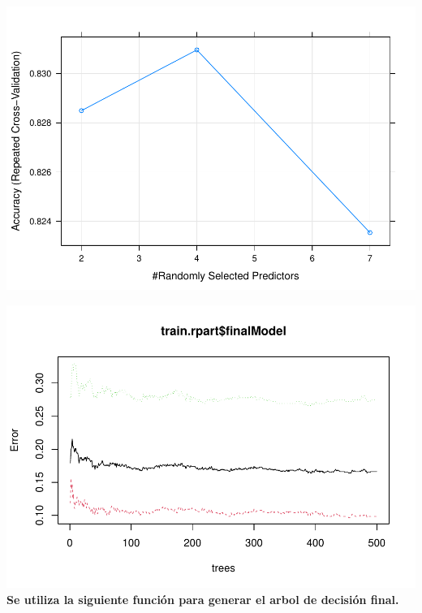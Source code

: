 \documentclass[
]{article}
\newenvironment{Shaded}{\begin{snugshade}}{\end{snugshade}}
\newcommand{\KeywordTok}[1]{\textcolor[rgb]{0.94,0.87,0.69}{#1}}
\newcommand{\NormalTok}[1]{\textcolor[rgb]{0.80,0.80,0.80}{#1}}
\newcommand{\OperatorTok}[1]{\textcolor[rgb]{0.94,0.94,0.82}{#1}}
\begin{document}
\includegraphics{m2851_PRA2_aruizplaza_rcotillas_files/figure-latex/unnamed-chunk-35-1.pdf}

\begin{Shaded}
\end{Shaded}

\includegraphics{m2851_PRA2_aruizplaza_rcotillas_files/figure-latex/unnamed-chunk-35-2.pdf}
\textbf{Se utiliza la siguiente función para generar el arbol de
decisión final.}
\end{document}
